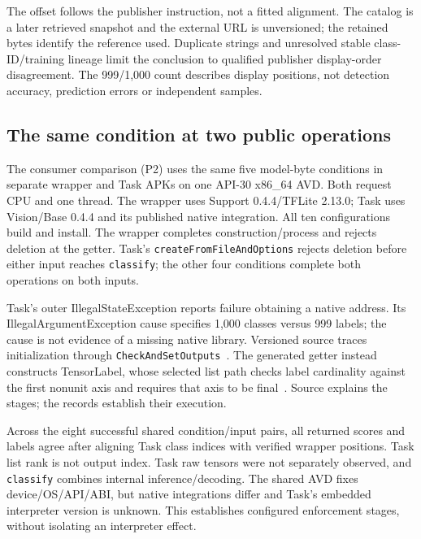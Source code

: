 \documentclass[10pt,conference]{IEEEtran}
\newcommand{\code}[1]{\texttt{#1}}
\begin{document}
The offset follows the publisher instruction, not a fitted alignment. The catalog is a later retrieved snapshot and the external URL is unversioned; the retained bytes identify the reference used. Duplicate strings and unresolved stable class-ID/training lineage limit the conclusion to qualified publisher display-order disagreement. The 999/1,000 count describes display positions, not detection accuracy, prediction errors or independent samples.

\subsection{The same condition at two public operations}
\label{sec:consumers}
The consumer comparison (P2) uses the same five model-byte conditions in separate wrapper and Task APKs on one API-30 x86\_64 AVD. Both request CPU and one thread. The wrapper uses Support 0.4.4/TFLite 2.13.0; Task uses Vision/Base 0.4.4 and its published native integration. All ten configurations build and install. The wrapper completes construction/process and rejects deletion at the getter. Task's \code{createFromFileAndOptions} rejects deletion before either input reaches \code{classify}; the other four conditions complete both operations on both inputs.

Task's outer IllegalStateException reports failure obtaining a native address. Its IllegalArgumentException cause specifies 1,000 classes versus 999 labels; the cause is not evidence of a missing native library. Versioned source traces initialization through \code{CheckAndSetOutputs}~\cite{task-classifier}. The generated getter instead constructs TensorLabel, whose selected list path checks label cardinality against the first nonunit axis and requires that axis to be final~\cite{tensorlabel}. Source explains the stages; the records establish their execution.

Across the eight successful shared condition/input pairs, all returned scores and labels agree after aligning Task class indices with verified wrapper positions. Task list rank is not output index. Task raw tensors were not separately observed, and \code{classify} combines internal inference/decoding. The shared AVD fixes device/OS/API/ABI, but native integrations differ and Task's embedded interpreter version is unknown. This establishes configured enforcement stages, without isolating an interpreter effect.
\end{document}
